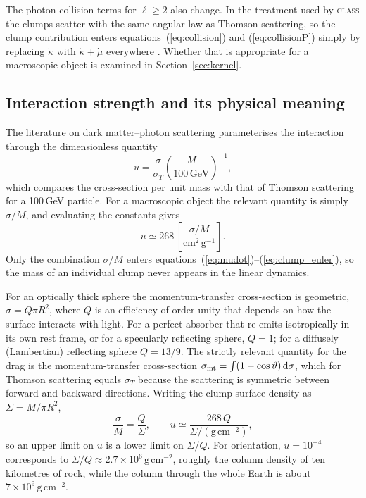 \documentclass[11pt,a4paper]{article}
\newcommand{\dd}{\mathrm{d}}
\begin{document}
The photon collision terms for $\ell\ge2$ also change. In the treatment used by \textsc{class} the clumps scatter with the same angular law as Thomson scattering, so the clump contribution enters equations~(\ref{eq:collision}) and (\ref{eq:collisionP}) simply by replacing $\dot\kappa$ with $\dot\kappa + \dot\mu$ everywhere \citep{Wilkinson2014, StadlerBoehm2018}. Whether that is appropriate for a macroscopic object is examined in Section~\ref{sec:kernel}.

\subsection{Interaction strength and its physical meaning}

The literature on dark matter--photon scattering parameterises the interaction through the dimensionless quantity
\begin{equation}
u = \frac{\sigma}{\sigma_T}\left(\frac{M}{100\,\mathrm{GeV}}\right)^{-1},
\end{equation}
which compares the cross-section per unit mass with that of Thomson scattering for a 100\,GeV particle. For a macroscopic object the relevant quantity is simply $\sigma/M$, and evaluating the constants gives
\begin{equation}
u \simeq 268\,\left[\frac{\sigma/M}{\mathrm{cm^2\,g^{-1}}}\right].
\end{equation}
Only the combination $\sigma/M$ enters equations~(\ref{eq:mudot})--(\ref{eq:clump_euler}), so the mass of an individual clump never appears in the linear dynamics.

For an optically thick sphere the momentum-transfer cross-section is geometric, $\sigma = Q\pi R^2$, where $Q$ is an efficiency of order unity that depends on how the surface interacts with light. For a perfect absorber that re-emits isotropically in its own rest frame, or for a specularly reflecting sphere, $Q=1$; for a diffusely (Lambertian) reflecting sphere $Q = 13/9$. The strictly relevant quantity for the drag is the momentum-transfer cross-section $\sigma_{\rm mt} = \int (1-\cos\vartheta)\,\dd\sigma$, which for Thomson scattering equals $\sigma_T$ because the scattering is symmetric between forward and backward directions. Writing the clump surface density as $\Sigma = M/\pi R^2$,
\begin{equation}
\frac{\sigma}{M} = \frac{Q}{\Sigma}, \qquad u \simeq \frac{268\,Q}{\Sigma/(\mathrm{g\,cm^{-2}})},
\end{equation}
so an upper limit on $u$ is a lower limit on $\Sigma/Q$. For orientation, $u = 10^{-4}$ corresponds to $\Sigma/Q \approx 2.7\times10^6\,\mathrm{g\,cm^{-2}}$, roughly the column density of ten kilometres of rock, while the column through the whole Earth is about $7\times10^9\,\mathrm{g\,cm^{-2}}$.
\end{document}
